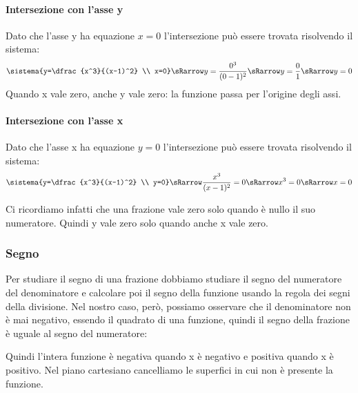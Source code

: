\paragraph{Intersezione con l'asse y}
Dato che l'asse y ha equazione \(x=0\) l'intersezione può essere trovata 
risolvendo il sistema:
\[\sistema{y=\dfrac{x^3}{(x-1)^2} \\ x=0} \sRarrow 
           y=\dfrac{0^3}{(0-1)^2} \sRarrow 
           y=\dfrac{0}{1} \sRarrow y=0\]
Quando x vale zero, anche y vale zero: la funzione passa per l'origine degli 
assi.

\begin{minipage}{.60\linewidth}
\paragraph{Intersezione con l'asse x}

Dato che l'asse x ha equazione \(y=0\) l'intersezione può essere trovata 
risolvendo il sistema:
\[\sistema{y=\dfrac{x^3}{(x-1)^2} \\ y=0} \sRarrow 
           \dfrac{x^3}{(x-1)^2}=0 \sRarrow x^3=0 \sRarrow x=0\]

Ci ricordiamo infatti che una frazione vale zero solo quando è nullo il suo 
numeratore.
Quindi y vale zero solo quando anche x vale zero.

\end{minipage}
\hfill
\begin{minipage}{.38\linewidth}
 \begin{center}
\assifunzionea
 \end{center}
\end{minipage}

\begin{minipage}{.60\linewidth}
\subsubsection{Segno}

Per studiare il segno di una frazione dobbiamo studiare il segno del 
numeratore del denominatore e calcolare poi il segno della funzione usando la 
regola dei segni della divisione. Nel nostro caso, però, possiamo osservare 
che il denominatore non è mai negativo, essendo il quadrato di una funzione, 
quindi il segno della frazione è uguale al segno del numeratore:
\begin{center}
 \segnoespressionea
\end{center}

Quindi l'intera funzione è negativa quando x è negativo e positiva quando x è 
positivo. Nel piano cartesiano cancelliamo le superfici in cui non è presente 
la funzione.

\end{minipage}
\hfill
\begin{minipage}{.38\linewidth}
 \begin{center}
\segnofunzionea
 \end{center}
\end{minipage}

